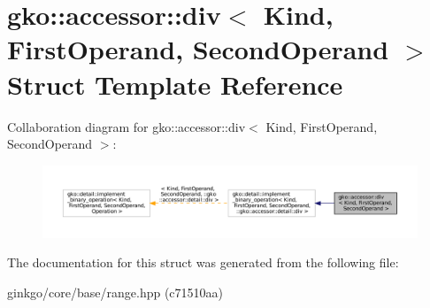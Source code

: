 \hypertarget{structgko_1_1accessor_1_1div}{}\section{gko\+:\+:accessor\+:\+:div$<$ Kind, First\+Operand, Second\+Operand $>$ Struct Template Reference}
\label{structgko_1_1accessor_1_1div}


Collaboration diagram for gko\+:\+:accessor\+:\+:div$<$ Kind, First\+Operand, Second\+Operand $>$\+:
\nopagebreak
\begin{figure}[H]
\begin{center}
\leavevmode
\includegraphics[width=350pt]{structgko_1_1accessor_1_1div__coll__graph}
\end{center}
\end{figure}


The documentation for this struct was generated from the following file\+:\begin{DoxyCompactItemize}
\item 
ginkgo/core/base/range.\+hpp (c71510aa)\end{DoxyCompactItemize}
